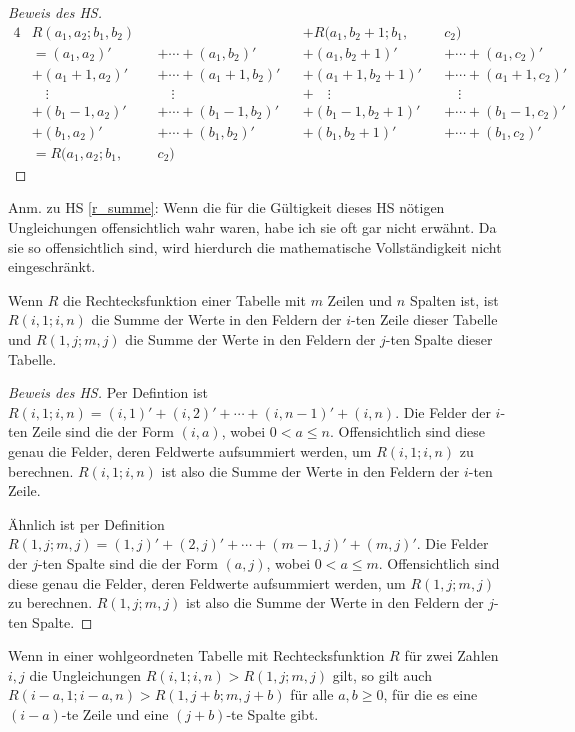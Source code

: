 \begin{proof}[Beweis des HS]
\begin{alignat*}{4}
        &R(a_1, a_2; b_1, b_2)&& &&+R(a_1, b_2+1; b_1, &&c_2)\\
        &=(a_1, a_2)' &&+\cdots+ (a_1, b_2)'
        &&+(a_1, b_2+1)'&&+\cdots+(a_1, c_2)'\\
        &+(a_1+1, a_2)'&&+\cdots+ (a_1+1, b_2)'
        &&+(a_1+1, b_2+1)'&&+\cdots+(a_1+1, c_2)'\\
        & \quad\vdots&&\quad\vdots&&+\quad\vdots&&\quad\vdots\\
        &+(b_1-1, a_2)'&&+\cdots + (b_1-1, b_2)'
        &&+(b_1-1, b_2+1)'&&+\cdots+(b_1-1, c_2)'\\
        &+(b_1, a_2)'&&+ \cdots + (b_1, b_2)'
        &&+(b_1, b_2+1)'&&+\cdots+(b_1, c_2)'\\
        &=R(a_1, a_2; b_1, &&c_2)
    \end{alignat*}
\end{proof}
Anm.  zu HS \ref{r_summe}: Wenn die für die Gültigkeit dieses HS nötigen Ungleichungen offensichtlich wahr waren, 
habe ich sie oft gar nicht erwähnt. Da sie so offensichtlich sind, wird hierdurch die mathematische Vollständigkeit 
nicht eingeschränkt.
\begin{lem}\label{r_zeile_spalte}
    Wenn $R$ die Rechtecksfunktion einer Tabelle mit $m$ Zeilen und $n$ Spalten ist, ist $R(i, 1; i, n)$ die Summe 
    der Werte in den Feldern der $i$-ten Zeile dieser Tabelle und $R(1, j; m, j)$ die Summe der Werte in den Feldern 
    der $j$-ten Spalte dieser Tabelle.
\end{lem}
\begin{proof}[Beweis des HS]
    Per Defintion ist $R(i, 1; i, n)=(i, 1)'+(i, 2)'+\cdots+(i, n-1)'+(i, n)$. Die Felder der $i$-ten Zeile sind die 
    der Form $(i, a)$, wobei $0<a\leq n$. Offensichtlich sind diese genau die Felder, deren Feldwerte aufsummiert 
    werden, um $R(i, 1; i, n)$ zu berechnen. $R(i, 1; i, n)$ ist also die Summe der Werte in den Feldern der $i$-ten 
    Zeile.

    Ähnlich ist per Definition $R(1, j; m, j)=(1, j)'+(2, j)'+\cdots+(m-1, j)'+(m, j)'$. Die Felder der $j$-ten Spalte 
    sind die der Form $(a, j)$, wobei $0<a\leq m$. Offensichtlich sind diese genau die Felder, deren Feldwerte 
    aufsummiert werden, um $R(1, j; m, j)$ zu berechnen. $R(1, j; m, j)$ ist also die Summe der Werte in den Feldern 
    der $j$-ten Spalte.
\end{proof}
\begin{lem}\label{mehr_nuller}
    Wenn in einer wohlgeordneten Tabelle mit Rechtecksfunktion $R$ für zwei Zahlen $i, j$ die Ungleichungen 
    $R(i, 1; i, n)>R(1, j; m, j)$ gilt, so gilt auch $R(i-a, 1; i-a, n)>R(1, j+b; m, j+b)$ für alle $a, b\geq0$, für 
    die es eine $(i-a)$-te Zeile und eine $(j+b)$-te Spalte gibt.
\end{lem}
